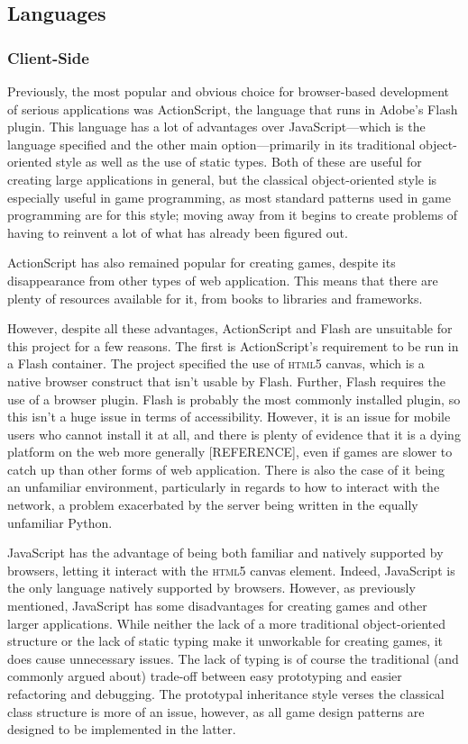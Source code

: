 \subsection{Languages}
\subsubsection{Client-Side}
Previously, the most popular and obvious choice for browser-based development of serious applications was ActionScript, the language that runs in Adobe's Flash plugin. This language has a lot of advantages over JavaScript---which is the language specified and the other main option---primarily in its traditional object-oriented style as well as the use of static types. Both of these are useful for creating large applications in general, but the classical object-oriented style is especially useful in game programming, as most standard patterns used in game programming are for this style; moving away from it begins to create problems of having to reinvent a lot of what has already been figured out.

ActionScript has also remained popular for creating games, despite its disappearance from other types of web application. This means that there are plenty of resources available for it, from books to libraries and frameworks.

However, despite all these advantages, ActionScript and Flash are unsuitable for this project for a few reasons. The first is ActionScript's requirement to be run in a Flash container. The project specified the use of \textsc{html5} canvas, which is a native browser construct that isn't usable by Flash. Further, Flash requires the use of a browser plugin. Flash is probably the most commonly installed plugin, so this isn't a huge issue in terms of accessibility. However, it is an issue for mobile users who cannot install it at all, and there is plenty of evidence that it is a dying platform on the web more generally [REFERENCE], even if games are slower to catch up than other forms of web application. There is also the case of it being an unfamiliar environment, particularly in regards to how to interact with the network, a problem exacerbated by the server being written in the equally unfamiliar Python.

JavaScript has the advantage of being both familiar and natively supported by browsers, letting it interact with the \textsc{html5} canvas element. Indeed, JavaScript is the only language natively supported by browsers. However, as previously mentioned, JavaScript has some disadvantages for creating games and other larger applications. While neither the lack of a more traditional object-oriented structure or the lack of static typing make it unworkable for creating games, it does cause unnecessary issues. The lack of typing is of course the traditional (and commonly argued about) trade-off between easy prototyping and easier refactoring and debugging. The prototypal inheritance style verses the classical class structure is more of an issue, however, as all game design patterns are designed to be implemented in the latter.

